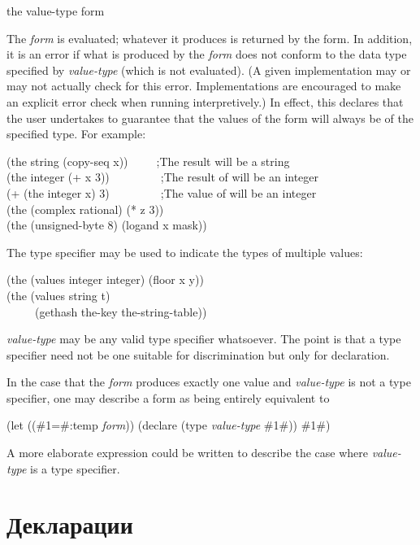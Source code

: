 \begin{defspec}
the value-type form

The \emph{form} is evaluated; whatever it produces is returned by
the  form.  In addition, it is an error if what is produced
by the \emph{form} does not conform to the data type specified by \emph{value-type}
(which is not evaluated).  (A given implementation may or may not
actually check for this error.  Implementations are encouraged to make an
explicit error check when running interpretively.)  In effect, this
declares that the user undertakes to guarantee that the values of
the form will always be of the specified type.
For example:
\begin{lisp}
(the string (copy-seq x))~~~~~;\textrm{The result will be a string} \\
(the integer (+ x 3))~~~~~~~~~;\textrm{The result of \cdf{+} will be an integer} \\
(+ (the integer x) 3)~~~~~~~~~;\textrm{The value of  will be an integer} \\
(the (complex rational) (* z 3)) \\
(the (unsigned-byte 8) (logand x mask))
\end{lisp}
The  type specifier may be used to indicate the types
of multiple values:
\begin{lisp}
(the (values integer integer) (floor x y)) \\
(the (values string t) \\
~~~~~(gethash the-key the-string-table))
\end{lisp}

\emph{value-type} may be any valid type specifier whatsoever.
The point is that a type specifier need not be one suitable for
discrimination but only for declaration.

In the case that the \emph{form} produces exactly one value and \emph{value-type}
is not a  type specifier, one may describe a  form
as being entirely equivalent to
\begin{lisp}
(let ((\#1=\#:temp \emph{form})) (declare (type \emph{value-type} \#1\#)) \#1\#)
\end{lisp}
A more elaborate expression could be written to describe the case where
\emph{value-type} is a  type specifier.
\end{defspec}

\else

\chapter{Декларации}
\label{DECLAR}

